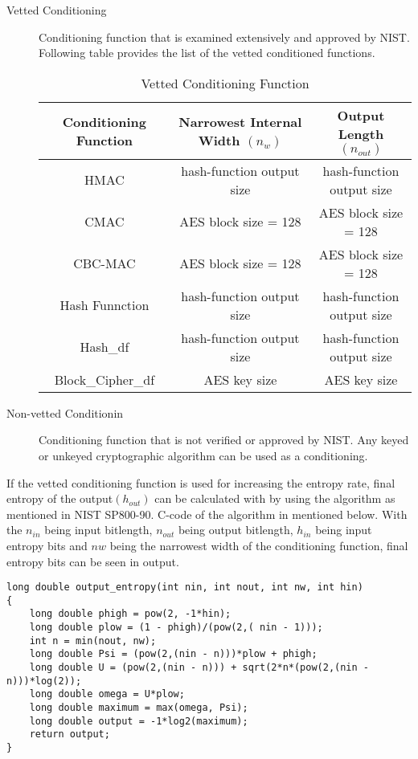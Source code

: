 \begin{description}
	\item[Vetted Conditioning] Conditioning function that is examined extensively and approved by NIST. Following table provides the list of the vetted conditioned functions.
	\begin{table}[htbp]
		\centering
		\label{table:2:1}
		\begin{tabular}{||c c c||} 
			 \hline
			Conditioning Function & Narrowest Internal Width $(n_{w})$ & Output Length
			$(n_{out})$
			 \\ [0.5ex] 
			\hline\hline
			HMAC & hash-function output size & hash-function output size \\
			CMAC & AES block size = 128 & AES block size = 128 \\
			CBC-MAC & AES block size = 128 & AES block size = 128 \\
			Hash Funnction & hash-function output size & hash-function output size \\
			Hash\_df & hash-function output size & hash-function output size \\
			Block\_Cipher\_df & AES key size & AES key size \\
			\hline
		\end{tabular}
		\caption{Vetted Conditioning Function}
	\end{table}
	\item[Non-vetted Conditionin] Conditioning function that is not verified or approved by NIST. Any keyed or unkeyed cryptographic algorithm can be used as a conditioning.
\end{description}

If the vetted conditioning function is used for increasing the entropy rate, final entropy of the output$(h_{out})$ can be calculated with by using the algorithm as mentioned in NIST SP800-90. C-code of the algorithm in mentioned below. With the $n_{in}$ being input bitlength, $n_{out}$ being output bitlength, $h_{in}$ being input entropy bits and $nw$ being the narrowest width of the conditioning function, final entropy bits can be seen in output.

\begin{lstlisting}
long double output_entropy(int nin, int nout, int nw, int hin)
{
	long double phigh = pow(2, -1*hin);
	long double plow = (1 - phigh)/(pow(2,( nin - 1)));
	int n = min(nout, nw);
	long double Psi = (pow(2,(nin - n)))*plow + phigh;
	long double U = (pow(2,(nin - n))) + sqrt(2*n*(pow(2,(nin - n)))*log(2));
	long double omega = U*plow;
	long double maximum = max(omega, Psi);
	long double output = -1*log2(maximum);
	return output;
}

\end{lstlisting}


